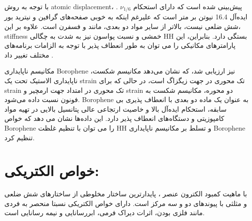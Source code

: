 با توجه به روش \gls{atomic displacement}، \cite{zhangElasticityFlexibilityIdeal2017, schabelENERGETICSINTERPLANARBINDING1992, wangStrainEffectsBorophene2016}. $\nu_{1/6}$ پیش‌بینی شده است که دارای استحکام ایده‌آل 16.4 نیوتن بر متر است که علیرغم اینکه به خوبی صفحه‌های گرافین و نیترید بور شش ضلعی  نیست، بالاتر از سایر مواد دو بعدی، مانند  \cite{liIdealStrengthPhonon2012, zouPredictingDislocationsGrain2013}و فسفرن\cite{weiSuperiorMechanicalFlexibility2014} است. علاوه بر این، \gls{stiffness} خمشی و نسبت پواسون نیز به شدت به چگالی \glsdesc{HH} بستگی دارد. بنابراین، این پارامترهای مکانیکی را می توان به طور انعطاف پذیر با توجه به الزامات برنامه‌های مختلف تغییر داد \cite{zhangElasticityFlexibilityIdeal2017}.

مکانیسم ناپایداری \gls{Borophene} نیز ارزیابی شد، \cite{wangStrainEffectsBorophene2016, zhongElectronicMechanicalProperties2018, weiSuperiorMechanicalFlexibility2014, zouPredictingDislocationsGrain2013} که نشان می‌دهد مکانیسم شکست، ناپایداری الاستیک تحت یک \gls{strain} تک محوری در جهت زیگزاگ است، در حالی که برای \gls{strain} تک محوری در امتداد جهت ارمچیر و \gls{strain} دو محوره، مکانیسم شکست به فونون نسبت داده می‌شود. \gls{Borophene} به عنوان یک ماده دو بعدی با انعطاف پذیری بی سابقه، استحکام ایده‌آل بالا و خاصیت ارتجاعی عالی پتانسیل بالایی در تهیه مواد کامپوزیتی و دستگاه‌های انعطاف پذیر دارد. این داده‌ها نشان می دهد که خواص \gls{Borophene} را می توان با تنظیم غلظت \glsdesc{HH} و تسلط بر مکانیسم ناپایداری \gls{Borophene} تنظیم کرد.

\section{خواص الکتریکی:}
با ماهیت کمبود الکترون عنصر ، پایدارترین ساختار مخلوطی از ساختارهای شش ضلعی و مثلثی \cite{tangNovelPrecursorsBoron2007} با پیوندهای دو و سه مرکز است. دارای خواص الکتریکی نسبتا منحصر به فردی مانند فلزی بودن، اثرات دیراک فرمی، ابررسانایی و نیمه رسانایی است.
